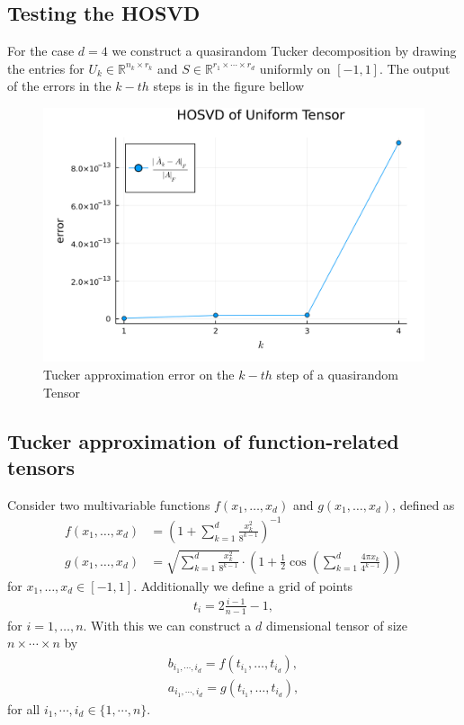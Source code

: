 \documentclass[a4paper]{article}
\begin{document}
\subsection{Testing the HOSVD}
For the case $d=4$ we construct a quasirandom Tucker decomposition by drawing
the entries for $U_k \in \mathbb{R}^{n_k \times r_k}$ and $S \in \mathbb{R}^{r_1
\times \cdots \times r_d}$ uniformly on $[-1, 1]$. The output of the errors in
the $k-th$ steps is in the figure bellow
\begin{figure}[H]
    \centering
    \includegraphics[width=\textwidth]{"./plots/hosvd-uniform-error.png"}
    \caption{Tucker approximation error on the $k-th$ step of a quasirandom
    Tensor}
\end{figure}
\subsection{Tucker approximation of function-related tensors \label{sec:
repeat}}
Consider two multivariable functions $f(x_1, \dots, x_d)$ and $g(x_1, \dots,
x_d)$, defined as
\begin{align}
    f(x_1, \dots, x_d) &= \left(1+\sum_{k=1}^d \frac{x^2_k}{8^{k-1}}
        \right)^{-1}\\
    g(x_1, \dots, x_d) &= \sqrt{\sum_{k=1}^d \frac{x_k^2}{8^{k-1}}} \cdot
    \left(1+\frac{1}{2}\cos\left(\sum_{k=1}^d \frac{4\pi x_k}{4^{k-1}}\right) \right)
\end{align}
for $x_1, \dots, x_d \in [-1, 1]$. Additionally we define a grid of points
\begin{align}
    t_i = 2 \frac{i-1}{n-1} -1 ,
\end{align}
for $i = 1, \dots, n$. With this we can construct a $d$ dimensional tensor of
size $n \times \cdots \times n$ by
\begin{align}
    b_{i_1, \cdots, i_d} = f(t_{i_1}, \dots, t_{i_d}),\\
    a_{i_1, \cdots, i_d} = g(t_{i_1}, \dots, t_{i_d}),
\end{align}
for all $i_1, \cdots, i_d \in \{1, \cdots, n\}$.
\end{document}
